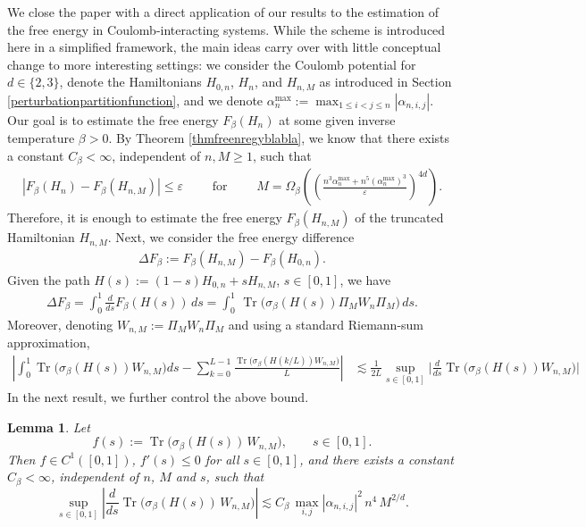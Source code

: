 \documentclass[11pt]{amsart}
\newcommand{\1}{\mathbbm{1}}
\newcommand{\Tr}{\operatorname{Tr}}
\theoremstyle{plain}
\newtheorem{lemma}[theorem]{Lemma}
\theoremstyle{definition}
\theoremstyle{remark}
\numberwithin{equation}{section}
\begin{document}
\noindent We close the paper with a direct application of our results to the estimation of the free energy in Coulomb-interacting systems. While the scheme is introduced here in a simplified framework, the main ideas carry over with little conceptual change to more interesting settings: we consider the Coulomb potential for $d\in\{2,3\}$, denote the Hamiltonians $H_{0,n}$, $H_n$, and $H_{n,M}$ as introduced in Section \ref{perturbationpartitionfunction}, and we denote  $\alpha^{\max}_n:=\max_{1\le i<j\le n}|\alpha_{n,i,j}|$. Our goal is to estimate the free energy $F_\beta(H_{n})$ at some given inverse temperature $\beta>0$. By Theorem \ref{thmfreenregyblabla}, we know that there exists a constant $C_\beta<\infty$, independent of $n,M\ge 1$, such that
\begin{align}
\label{eq:MScalingFreeEnergy}
|F_\beta(H_n)-F_{\beta}(H_{n,M})|
\le \varepsilon\qquad \text{ for }\qquad M=\Omega_\beta\left(\left(\frac{n^3\alpha^{\max}_n+n^{5}(\alpha^{\max}_n)^3}{\varepsilon}\right)^{4d}\right).
\end{align}
Therefore, it is enough to estimate the free energy $F_\beta(H_{n,M})$ of the truncated Hamiltonian $H_{n,M}$. Next, we consider the free energy difference
\begin{align*}
\Delta F_\beta:=F_\beta(H_{n,M})-F_\beta(H_{0,n}).
\end{align*}
Given the path $H(s):=(1-s)H_{0,n}+sH_{n,M}$, $s\in[0,1]$, we have
\begin{align}
\Delta F_\beta=\int_0^1 \frac{d}{ds} F_\beta(H(s))\,ds= \int_0^1\,\Tr\Big(\sigma_\beta(H(s))\Pi_M W_n \Pi_M \Big)\, ds.\label{integralpartitions}
\end{align}
Moreover, denoting $W_{n,M}:=\Pi_M W_n \Pi_M$ and using a standard Riemann-sum approximation,
 \begin{align}
 \label{eq:RiemannFreeEnergy}
\left|\int_0^1\!\Tr\Big(\sigma_\beta(H(s))W_{n,M} \Big)ds\!-\!\sum_{k=0}^{L-1}\frac{\Tr\Big(\sigma_\beta(H(k/L))W_{n,M} \Big)}{L}\right|&\!\lesssim \!\frac{1}{2L}\!\sup_{s\in [0,1]}\Big|\frac{d}{ds}\!\Tr\!\Big(\!\sigma_\beta(H(s))W_{n,M} \!\Big)\!\Big|
 \end{align}
In the next result, we further control the above bound. 
\begin{lemma}
\label{lem:riemann-derivative-bound}
Let
\[
f(s):=\Tr\!\big(\sigma_\beta(H(s))\,W_{n,M}\big),\qquad s\in[0,1].
\]
Then \(f\in C^1([0,1])\), \(f'(s)\le 0\) for all \(s\in[0,1]\), and there exists a constant \(C_\beta<\infty\), independent of \(n\), \(M\) and \(s\), such that
\begin{equation}
\label{eq:derivative-riemann-bound}
\sup_{s\in[0,1]}
\left|
\frac{d}{ds}\Tr\!\big(\sigma_\beta(H(s))\,W_{n,M}\big)
\right|
\lesssim
C_\beta\,\max_{i,j}|\alpha_{n,i,j}|^2\,n^4\,M^{2/d}.
\end{equation}
\end{lemma}
\end{document}
